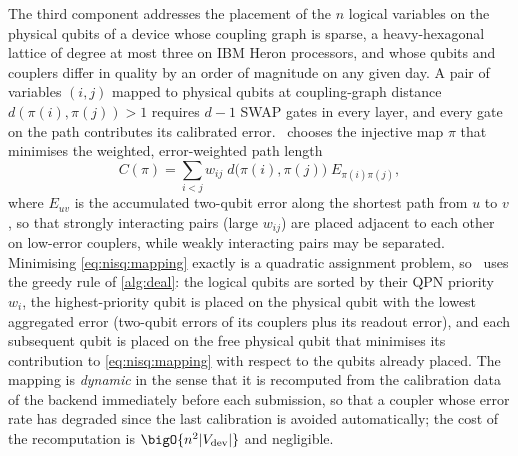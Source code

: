 The third component addresses the placement of the $n$ logical variables on the physical qubits of a device whose coupling graph is sparse, a heavy-hexagonal lattice of degree at most three on IBM Heron processors, and whose qubits and couplers differ in quality by an order of magnitude on any given day. A pair of variables $(i,j)$ mapped to physical qubits at coupling-graph distance $d(\pi(i),\pi(j))>1$ requires $d-1$ SWAP gates in every layer, and every gate on the path contributes its calibrated error. \deal\ chooses the injective map $\pi$ that minimises the weighted, error-weighted path length
\begin{equation}\label{eq:nisq:mapping}
  C(\pi) = \sum_{i<j} w_{ij}\; d\bigl(\pi(i),\pi(j)\bigr)\; E_{\pi(i)\pi(j)},
\end{equation}
where $E_{uv}$ is the accumulated two-qubit error along the shortest path from $u$ to $v$, so that strongly interacting pairs (large $w_{ij}$) are placed adjacent to each other on low-error couplers, while weakly interacting pairs may be separated. Minimising \cref{eq:nisq:mapping} exactly is a quadratic assignment problem, so \deal\ uses the greedy rule of \cref{alg:deal}: the logical qubits are sorted by their QPN priority $w_{i}$, the highest-priority qubit is placed on the physical qubit with the lowest aggregated error (two-qubit errors of its couplers plus its readout error), and each subsequent qubit is placed on the free physical qubit that minimises its contribution to \cref{eq:nisq:mapping} with respect to the qubits already placed. The mapping is \emph{dynamic} in the sense that it is recomputed from the calibration data of the backend immediately before each submission, so that a coupler whose error rate has degraded since the last calibration is avoided automatically; the cost of the recomputation is $\bigO{n^{2}\lvert V_{\mathrm{dev}}\rvert}$ and negligible.

